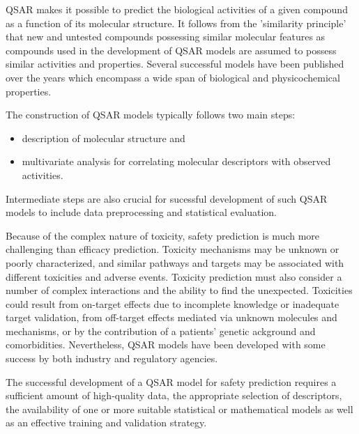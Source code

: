 QSAR makes it possible to predict the biological activities of a given compound as a function of its molecular structure. It follows from the 'similarity principle' that new and untested compounds possessing similar molecular features as compounds used in the development of QSAR models are assumed to possess similar activities and properties. Several successful models have been published over the years which encompass a wide span of biological and physicochemical properties.

The construction of QSAR models typically follows two main steps:
\begin{itemize}
\item description of molecular structure and
\item  multivariate analysis for correlating molecular descriptors with observed activities. 
\end{itemize}
Intermediate steps are also crucial for sucessful development of such QSAR models to include data preprocessing and statistical evaluation. \cite{Nantasenamat2009}

Because of the complex nature of toxicity, safety prediction is much more challenging than efficacy prediction. Toxicity mechanisms may be unknown or poorly characterized, and similar pathways and targets may be associated with different toxicities and adverse events. Toxicity prediction must also consider a number of complex interactions and the ability to find the unexpected. Toxicities could result from on-target effects due to incomplete knowledge or inadequate target validation, from off-target effects mediated via unknown molecules and mechanisms, or by the contribution of a patients’ genetic ackground and comorbidities. Nevertheless, QSAR models have been developed with some success by both industry and regulatory agencies.\cite{Kruhlak2012}

The successful development of a QSAR model for safety prediction requires a sufficient amount of high-quality data, the appropriate selection of descriptors, the availability of one or more suitable statistical or mathematical models as well as an effective training and validation strategy.\cite{Kruhlak2012}



